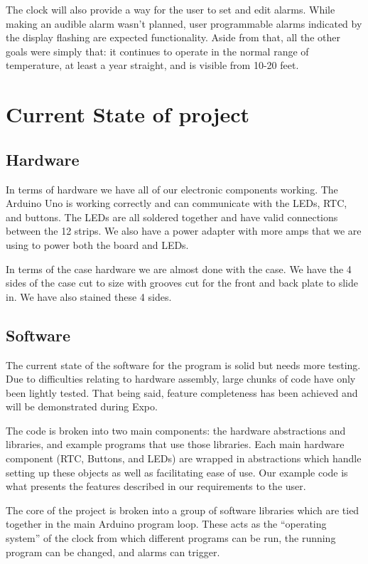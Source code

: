 \documentclass[onecolumn, draftclsnofoot,10pt, compsoc]{IEEEtran}
\begin{document}
The clock will also provide a way for the user to set and edit alarms. While making an audible alarm wasn’t planned, user programmable alarms indicated by the display flashing are expected functionality.
Aside from that, all the other goals were simply that: it continues to operate in the normal range of temperature, at least a year straight, and is visible from 10-20 feet.


\section{Current State of project}

\subsection{Hardware}
In terms of hardware we have all of our electronic components working.
The Arduino Uno is working correctly and can communicate with the LEDs, RTC, and buttons.
The LEDs are all soldered together and have valid connections between the 12 strips.
We also have a power adapter with more amps that we are using to power both the board and LEDs.

In terms of the case hardware we are almost done with the case.
We have the 4 sides of the case cut to size with grooves cut for the front and back plate to slide in.
We have also stained these 4 sides.

\subsection{Software}
The current state of the software for the program is solid but needs more testing.
Due to difficulties relating to hardware assembly, large chunks of code have only been lightly tested.
That being said, feature completeness has been achieved and will be demonstrated during Expo.

The code is broken into two main components: the hardware abstractions and libraries, and example programs that use those libraries.
Each main hardware component (RTC, Buttons, and LEDs) are wrapped in abstractions which handle setting up these objects as well as facilitating ease of use.
Our example code is what presents the features described in our requirements to the user.

The core of the project is broken into a group of software libraries which are tied together in the main Arduino program loop.
These acts as the “operating system” of the clock from which different programs can be run, the running program can be changed, and alarms can trigger.
\end{document}
